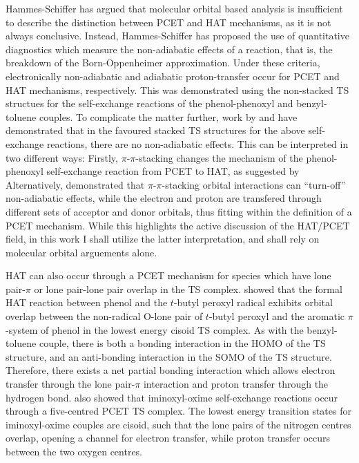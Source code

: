 Hammes-Schiffer has argued that molecular orbital based analysis is insufficient
to describe the distinction between PCET and HAT mechanisms, as it is not always
conclusive.\cite{Skone2006, HammesSchiffer2015} Instead, Hammes-Schiffer has
proposed the use of quantitative diagnostics which measure the non-adiabatic
effects of a reaction, that is, the breakdown of the Born-Oppenheimer
approximation.\cite{Sirjoosingh2011, HammesSchiffer2015} Under these criteria,
electronically non-adiabatic and adiabatic proton-transfer occur for PCET and
HAT mechanisms, respectively. This was demonstrated using the non-stacked TS
structues for the self-exchange reactions of the phenol-phenoxyl and
benzyl-toluene couples. To complicate the matter further, work by
\citet{Inagaki2011} and \citet{MunozRugeles2017} have demonstrated that in the
favoured stacked TS structures for the above self-exchange reactions, there are
no non-adiabatic effects. This can be interpreted in two different ways:
Firstly, $\pi$-$\pi$-stacking changes the mechanism of the phenol-phenoxyl
self-exchange reaction from PCET to HAT, as suggested by \citet{Inagaki2011}
Alternatively, \citet{MunozRugeles2017} demonstrated that $\pi$-$\pi$-stacking
orbital interactions can ``turn-off'' non-adiabatic effects, while the electron
and proton are transfered through different sets of acceptor and donor orbitals,
thus fitting within the definition of a PCET mechanism. While this highlights
the active discussion of the HAT/PCET field, in this work I shall utilize the
latter interpretation, and shall rely on molecular orbital arguements alone.

HAT can also occur through a PCET mechanism for species which have lone
pair-$\pi$ or lone pair-lone pair overlap in the TS complex.\cite{DiLabio2007,
DiLabio2005} \citet{DiLabio2007} showed that the formal HAT reaction between
phenol and the $t$-butyl peroxyl radical exhibits orbital overlap between the
non-radical O-lone pair of $t$-butyl peroxyl and the aromatic $\pi$-system of
phenol in the lowest energy cisoid TS complex. As with the benzyl-toluene
couple, there is both a bonding interaction in the HOMO of the TS structure, and
an anti-bonding interaction in the SOMO of the TS structure. Therefore, there
exists a net partial bonding interaction which allows electron transfer through
the lone pair-$\pi$ interaction and proton transfer through the hydrogen bond.
\citet{DiLabio2005} also showed that iminoxyl-oxime self-exchange reactions
occur through a five-centred PCET TS complex. The lowest energy transition
states for iminoxyl-oxime couples are cisoid, such that the lone pairs of the
nitrogen centres overlap, opening a channel for electron transfer, while proton
transfer occurs between the two oxygen centres.


